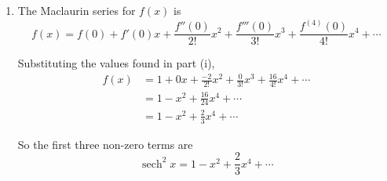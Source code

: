 \documentclass[leqno]{article}
\begin{document}
\begin{enumerate}[
  label=\textbf{\arabic*.},
  leftmargin=*,
  topsep=0pt,
  partopsep=0pt,
  parsep=0pt
]
\begin{tcolorbox}[colback=white, colframe=scarlet, title={\textbf{Solution}}, breakable, grow to left by=6mm, grow to right by=10mm]
\begin{enumerate}[label=\textbf{(\alph*)}]
\begin{enumerate}[label=(\roman*)]
    Differentiate again:
    \begin{align*}
    f''(x)
    &= -2f'\tanh x-2f\operatorname{sech}^2x \\
    &= -2f'\tanh x-2f^2
    \end{align*}

    Since
    \[
    \tanh^2x=1-\operatorname{sech}^2x=1-f
    \]
    and \(f'=-2f\tanh x\),
    \begin{align*}
    f''(x)
    &= -2(-2f\tanh x)\tanh x-2f^2 \\
    &= 4f\tanh^2x-2f^2 \\
    &= 4f(1-f)-2f^2 \\
    &= 4f-6f^2
    \end{align*}

    Now evaluate at \(x=0\). Since \(\operatorname{sech}0=1\) and \(\tanh 0=0\),
    \[
    f(0)=1
    \]
    \[
    f'(0)=-2f(0)\tanh 0=0
    \]
    \[
    f''(0)=4f(0)-6f(0)^2=4-6=-2
    \]

    Differentiate \(f''=4f-6f^2\):
    \[
    f'''=4f'-12ff'
    \]
    so
    \[
    f'''(0)=4f'(0)-12f(0)f'(0)=0
    \]

    Differentiate once more:
    \[
    f^{(4)}=4f''-12\bigl((f')^2+ff''\bigr)
    \]
    Hence
    \begin{align*}
    f^{(4)}(0)
    &= 4f''(0)-12\bigl((f'(0))^2+f(0)f''(0)\bigr) \\
    &= 4(-2)-12\bigl(0+1(-2)\bigr) \\
    &= -8+24 \\
    &= 16
    \end{align*}

    Therefore
    \[
    f^{(4)}(0)=16
    \]

    \item The Maclaurin series for \(f(x)\) is
    \[
    f(x)=f(0)+f'(0)x+\frac{f''(0)}{2!}x^2+\frac{f'''(0)}{3!}x^3+\frac{f^{(4)}(0)}{4!}x^4+\cdots
    \]

    Substituting the values found in part (i),
    \begin{align*}
    f(x)
    &= 1+0x+\frac{-2}{2!}x^2+\frac{0}{3!}x^3+\frac{16}{4!}x^4+\cdots \\
    &= 1-x^2+\frac{16}{24}x^4+\cdots \\
    &= 1-x^2+\frac{2}{3}x^4+\cdots
    \end{align*}

    So the first three non-zero terms are
    \[
    \operatorname{sech}^2x=1-x^2+\frac{2}{3}x^4+\cdots
    \]
  \end{enumerate}


\end{enumerate}
\end{tcolorbox}
\end{enumerate}
\end{document}
